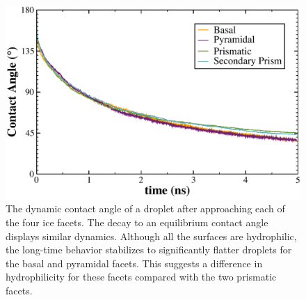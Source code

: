 \begin{figure}
\includegraphics[width=\linewidth]{Figures/ContactAngle}
\caption{\label{fig:ContactAngle} The dynamic contact angle of a
  droplet after approaching each of the four ice facets.  The decay to
  an equilibrium contact angle displays similar dynamics.  Although
  all the surfaces are hydrophilic, the long-time behavior stabilizes
  to significantly flatter droplets for the basal and pyramidal
  facets.  This suggests a difference in hydrophilicity for these
  facets compared with the two prismatic facets.}
\end{figure}


